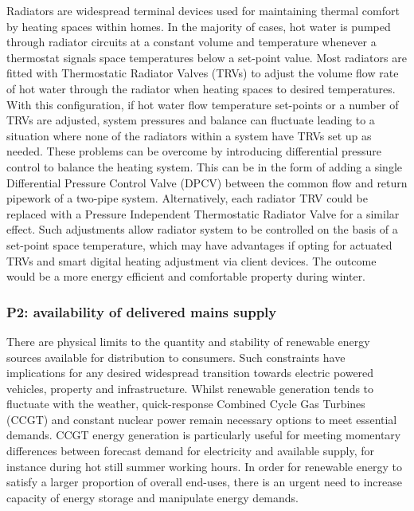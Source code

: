 \documentclass[11pt, oneside]{book}   	%
\begin{document}
Radiators are widespread terminal devices used for maintaining thermal comfort by heating spaces within homes.
In the majority of cases, hot water is pumped through radiator circuits at a constant volume and temperature whenever a thermostat signals space temperatures below a set-point value.
Most radiators are fitted with Thermostatic Radiator Valves (TRVs) to adjust the volume flow rate of hot water through the radiator when heating spaces to desired temperatures.
With this configuration, if hot water flow temperature set-points or a number of TRVs are adjusted, system pressures and balance can fluctuate leading to a situation where none of the radiators within a system have TRVs set up as needed.
These problems can be overcome by introducing differential pressure control to balance the heating system.
This can be in the form of adding a single Differential Pressure Control Valve (DPCV) between the common flow and return pipework of a two-pipe system.
Alternatively, each radiator TRV could be replaced with a Pressure Independent Thermostatic Radiator Valve for a similar effect.
Such adjustments allow radiator system to be controlled on the basis of a set-point space temperature, which may have advantages if opting for actuated TRVs and smart digital heating adjustment via client devices.
The outcome would be a more energy efficient and comfortable property during winter.\

\subsubsection{P2: availability of delivered mains supply}
There are physical limits to the quantity and stability of renewable energy sources available for distribution to consumers.
Such constraints have implications for any desired widespread transition towards electric powered vehicles, property and infrastructure.
Whilst renewable generation tends to fluctuate with the weather, quick-response Combined Cycle Gas Turbines (CCGT) and constant nuclear power remain necessary options to meet essential demands.
CCGT energy generation is particularly useful for meeting momentary differences between forecast demand for electricity and available supply, for instance during hot still summer working hours.
In order for renewable energy to satisfy a larger proportion of overall end-uses, there is an urgent need to increase capacity of energy storage and manipulate energy demands.\
\end{document}
